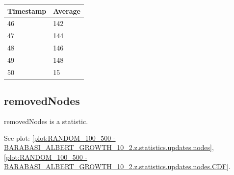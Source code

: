 \begin{tabular}{|l||l|}
\hline
	\textbf{Timestamp} & \textbf{Average} \\ \hline
	46 & 142 \\ \hline
	47 & 144 \\ \hline
	48 & 146 \\ \hline
	49 & 148 \\ \hline
	50 & 15 \\ \hline
\end{tabular}

\subsection{removedNodes}
removedNodes is a statistic.

See plot: \ref{plot:RANDOM_100_500 - BARABASI_ALBERT_GROWTH_10_2.z.statistics.updates.nodes}, \ref{plot:RANDOM_100_500 - BARABASI_ALBERT_GROWTH_10_2.z.statistics.updates.nodes.CDF}.

